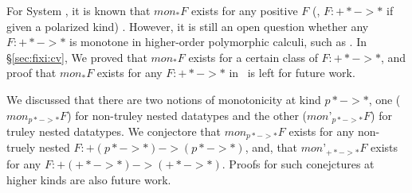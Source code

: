 For System \F, it is known that $mon_{*}F$ exists for any positive $F$
(\ie, $F:+* -> *$ if given a polarized kind) \cite{Mat99}. However,
it is still an open question whether any $F:+* -> *$ is monotone
in higher-order polymorphic calculi, such as \Fixi. In \S\ref{sec:fixi:cv},
We proved that $mon_{*}F$ exists for a certain class of $F:+* -> *$,
and proof that $mon_{*}F$ exists for any $F:+* -> *$ in \Fixi\ is
left for future work.

We discussed that there are two notions of monotonicity at kind $p* -> *$,
one ($\textit{mon}_{p* -> *}F$) for non-truley nested datatypes and
the other ($\textit{mon'}_{p* -> *}F$) for truley nested datatypes.
We conjectore that $\textit{mon}_{p* -> *}F$ exists for any non-truely nested
$F:+(p* -> *) -> (p* -> *)$, and, that $\textit{mon'}_{+* -> *}F$ exists
for any $F:+(+* -> *) -> (+* -> *)$. Proofs for such conejctures
at higher kinds are also future work.

